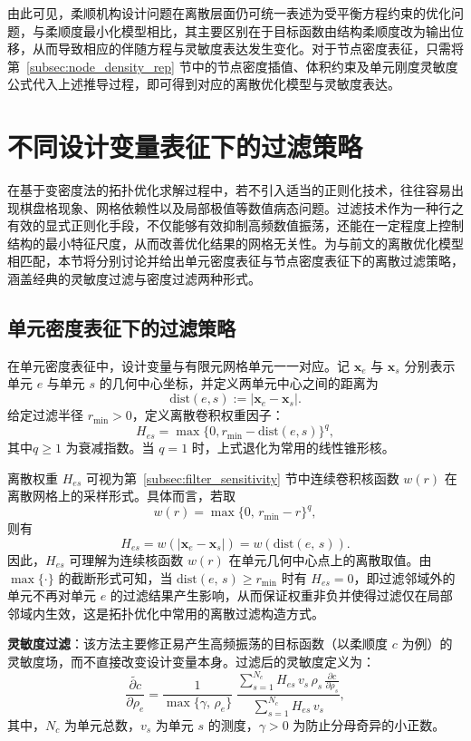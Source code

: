 由此可见，柔顺机构设计问题在离散层面仍可统一表述为受平衡方程约束的优化问题，与柔顺度最小化模型相比，其主要区别在于目标函数由结构柔顺度改为输出位移，从而导致相应的伴随方程与灵敏度表达发生变化。对于节点密度表征，只需将第~\ref{subsec:node_density_rep} 节中的节点密度插值、体积约束及单元刚度灵敏度公式代入上述推导过程，即可得到对应的离散优化模型与灵敏度表达。


\section{不同设计变量表征下的过滤策略}
\label{sec:diff_design_var_filtering}

在基于变密度法的拓扑优化求解过程中，若不引入适当的正则化技术，往往容易出现棋盘格现象、网格依赖性以及局部极值等数值病态问题。过滤技术作为一种行之有效的显式正则化手段，不仅能够有效抑制高频数值振荡，还能在一定程度上控制结构的最小特征尺度，从而改善优化结果的网格无关性。为与前文的离散优化模型相匹配，本节将分别讨论并给出单元密度表征与节点密度表征下的离散过滤策略，涵盖经典的灵敏度过滤与密度过滤两种形式。


\subsection{单元密度表征下的过滤策略}
\label{subsec:cell_density_filtering}

在单元密度表征中，设计变量与有限元网格单元一一对应。记 $\boldsymbol{x}_e$ 与 $\boldsymbol{x}_s$ 分别表示单元 $e$ 与单元 $s$ 的几何中心坐标，并定义两单元中心之间的距离为
\[
\mathrm{dist}(e,s) := \vert\boldsymbol{x}_e - \boldsymbol{x}_s\vert.
\]
给定过滤半径 $r_{\min}>0$，定义离散卷积权重因子：
\[
H_{es} = \max\{0,r_{\min} - \mathrm{dist}(e,s)\}^q,
\]
其中$q \geq 1$ 为衰减指数。当 $q=1$ 时，上式退化为常用的线性锥形核。

离散权重 $H_{es}$ 可视为第~\ref{subsec:filter_sensitivity} 节中连续卷积核函数 $w(r)$ 在离散网格上的采样形式。具体而言，若取
\[
w(r) = \max\{0,\,r_{\min} - r\}^q,
\]
则有
\[
H_{es} = w(\vert\boldsymbol{x}_e - \boldsymbol{x}_s\vert) = w(\mathrm{dist}(e,\,s)).
\]
因此，$H_{es}$ 可理解为连续核函数 $w(r)$ 在单元几何中心点上的离散取值。由 $\max\{\cdot\}$ 的截断形式可知，当 $\mathrm{dist}(e,\,s)\ge r_{\min}$ 时有 $H_{es}=0$，即过滤邻域外的单元不再对单元 $e$ 的过滤结果产生影响，从而保证权重非负并使得过滤仅在局部邻域内生效，这是拓扑优化中常用的离散过滤构造方式。

\textbf{灵敏度过滤}：该方法主要修正易产生高频振荡的目标函数（以柔顺度 $c$ 为例）的灵敏度场，而不直接改变设计变量本身。过滤后的灵敏度定义为：
\begin{equation} \label{eq:ch3_cell_sens_filter}
	\widetilde{\frac{\partial c}{\partial \rho_e}} = \frac{1}{\max\{\gamma,\,\rho_e\}}\; \frac{\sum_{s=1}^{N_c}H_{es}\,v_s\,\rho_s\, \frac{\partial c}{\partial \rho_s}} {\sum_{s=1}^{N_c}H_{es}\,v_s},
\end{equation}
其中，$N_c$ 为单元总数，$v_s$ 为单元 $s$ 的测度，$\gamma>0$ 为防止分母奇异的小正数。

